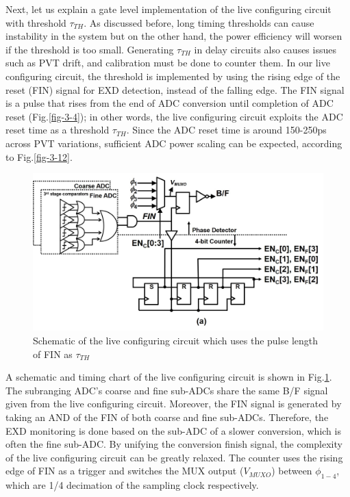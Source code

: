 Next, let us explain a gate level implementation of the live configuring circuit with threshold \textit{$\tau_{TH}$}. As discussed before, long timing thresholds can cause instability in the system but on the other hand, the power efficiency will worsen if the threshold is too small. Generating \textit{$\tau_{TH}$} in delay circuits also causes issues such as PVT drift, and calibration must be done to counter them. In our live configuring circuit, the threshold is implemented by using the rising edge of the reset (FIN) signal for EXD detection, instead of the falling edge. The FIN signal is a pulse that rises from the end of ADC conversion until completion of ADC reset (Fig.\ref{fig-3-4}); in other words, the live configuring circuit exploits the ADC reset time as a threshold \textit{$\tau_{TH}$}. Since the ADC reset time is around 150-250ps across PVT variations, sufficient ADC power scaling can be expected, according to Fig.\ref{fig-3-12}. 

\begin{figure}
\centering
  \includegraphics[width=1\textwidth]{figure/chap3/fig13a.jpg}
  \caption{ Schematic of the live configuring circuit which uses the pulse length of FIN as $\tau_{TH}$}
  \label{fig-3-13}
\end{figure}

A schematic and timing chart of the live configuring circuit is shown in Fig.\ref{fig-3-13}. The subranging ADC's coarse and fine sub-ADCs share the same B/F signal given from the live configuring circuit. Moreover, the FIN signal is generated by taking an AND of the FIN of both coarse and fine sub-ADCs. Therefore, the EXD monitoring is done based on the sub-ADC of a slower conversion, which is often the fine sub-ADC. By unifying the conversion finish signal, the complexity of the live configuring circuit can be greatly relaxed. The counter uses the rising edge of FIN as a trigger and switches the MUX output (\textit{$V{}_{MUXO}$}) between \textit{$\phi_{1-4}$}, which are 1/4 decimation of the sampling clock respectively. 

